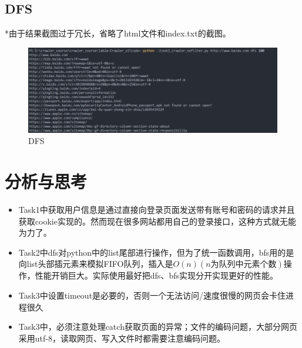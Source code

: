 \documentclass[12pt,a4paper,oneside]{article}
\begin{document}
\subsection{DFS}
*由于结果截图过于冗长，省略了html文件和index.txt的截图。
\begin{figure}[H] \centering
	\includegraphics[width=0.6\linewidth]{3_5.png}
	 \caption{DFS}
	
\end{figure}


\section{分析与思考}
\begin{itemize}
	\item Task1中获取用户信息是通过直接向登录页面发送带有账号和密码的请求并且获取cookie实现的。然而现在很多网站都用自己的登录接口，这种方式就无能为力了。
	\item Task2中dfs对python中的list尾部进行操作，但为了统一函数调用，bfs用的是向list头部插元素来模拟FIFO队列，插入是$O(n) (n 为队列中元素个数)$操作，性能开销巨大。实际使用最好把dfs、bfs实现分开实现更好的性能。
	\item Task3中设置timeout是必要的，否则一个无法访问/速度很慢的网页会卡住进程很久
	\item Task3中，必须注意处理catch获取页面的异常；文件的编码问题，大部分网页采用utf-8，读取网页、写入文件时都需要注意编码问题。
	
\end{itemize}
\end{document}
